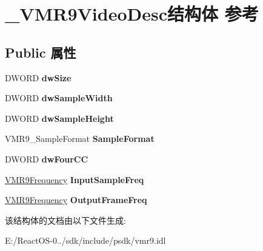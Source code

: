 \hypertarget{struct___v_m_r9_video_desc}{}\section{\+\_\+\+V\+M\+R9\+Video\+Desc结构体 参考}
\label{struct___v_m_r9_video_desc}
\subsection*{Public 属性}
\begin{DoxyCompactItemize}
\item 
\mbox{\label{struct___v_m_r9_video_desc_aca34ac92b42e18190e779e8d5694c9f6}} 
D\+W\+O\+RD {\bfseries dw\+Size}
\item 
\mbox{\label{struct___v_m_r9_video_desc_a5439a3cdd48c5d20abfbb7ababf2f7f9}} 
D\+W\+O\+RD {\bfseries dw\+Sample\+Width}
\item 
\mbox{\label{struct___v_m_r9_video_desc_a425b81048541ccb96a558279dbb7f03a}} 
D\+W\+O\+RD {\bfseries dw\+Sample\+Height}
\item 
\mbox{\label{struct___v_m_r9_video_desc_aa9560234a5fed36c35c2f356cba4b7d0}} 
V\+M\+R9\+\_\+\+Sample\+Format {\bfseries Sample\+Format}
\item 
\mbox{\label{struct___v_m_r9_video_desc_af4315128252edfb235b63aa9b5f7e9fc}} 
D\+W\+O\+RD {\bfseries dw\+Four\+CC}
\item 
\mbox{\label{struct___v_m_r9_video_desc_ab58be197576e9e8d93c72a26a5c48643}} 
\hyperlink{struct___v_m_r9_frequency}{V\+M\+R9\+Frequency} {\bfseries Input\+Sample\+Freq}
\item 
\mbox{\label{struct___v_m_r9_video_desc_a77b3d54ec6d49861bbf5a31963e8e4e6}} 
\hyperlink{struct___v_m_r9_frequency}{V\+M\+R9\+Frequency} {\bfseries Output\+Frame\+Freq}
\end{DoxyCompactItemize}


该结构体的文档由以下文件生成\+:\begin{DoxyCompactItemize}
\item 
E\+:/\+React\+O\+S-\/0../sdk/include/psdk/vmr9.\+idl\end{DoxyCompactItemize}
